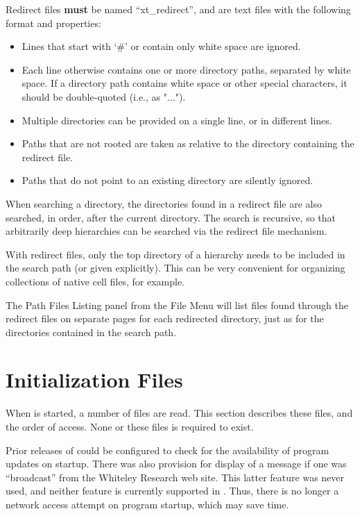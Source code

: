 Redirect files {\bf must} be named ``{\vt xt\_redirect}'', and are
text files with the following format and properties:

\begin{itemize}
\item{Lines that start with `{\vt \#}' or contain only white space
  are ignored.}
\item{Each line otherwise contains one or more directory paths,
  separated by white space.  If a directory path contains white
  space or other special characters, it should be double-quoted
  (i.e., as {\vt "..."}).}
\item{Multiple directories can be provided on a single line, or in
  different lines.}
\item{Paths that are not rooted are taken as relative to the
  directory containing the redirect file.}
\item{Paths that do not point to an existing directory are silently
  ignored.}
\end{itemize}

When searching a directory, the directories found in a redirect file
are also searched, in order, after the current directory.  The search
is recursive, so that arbitrarily deep hierarchies can be searched via
the redirect file mechanism.

With redirect files, only the top directory of a hierarchy needs to be
included in the search path (or given explicitly).  This can be very
convenient for organizing collections of native cell files, for
example.

The {\cb Path Files Listing} panel from the {\cb File Menu} will list
files found through the redirect files on separate pages for each
redirected directory, just as for the directories contained in the
search path.


\section{Initialization Files}

When {\Xic} is started, a number of files are read.  This section
describes these files, and the order of access.  None or these files
is required to exist.

Prior releases of {\Xic} could be configured to check for the
availability of program updates on startup.  There was also provision
for display of a message if one was ``broadcast'' from the Whiteley
Research web site.  This latter feature was never used, and neither
feature is currently supported in {\Xic}.  Thus, there is no longer a
network access attempt on program startup, which may save time.

